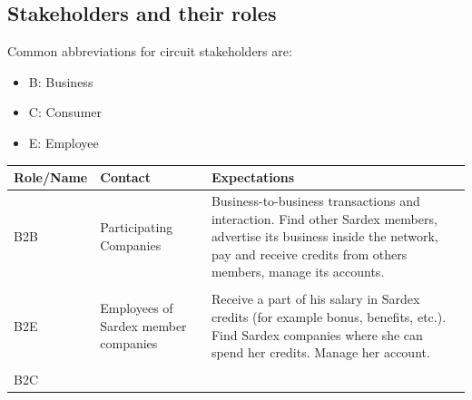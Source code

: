 \subsection{Stakeholders and their roles}\label{_stakeholders}
Common abbreviations for circuit stakeholders are:
\begin{itemize}
	\item B:  Business
	\item C:  Consumer
	\item E:  Employee	
\end{itemize}

{\small
\begin{longtable}[]{@{}lll@{}}
\toprule
\begin{minipage}[b]{0.18\columnwidth}\raggedright\strut
Role/Name\strut
\end{minipage} & \begin{minipage}[b]{0.25\columnwidth}\raggedright\strut
Contact\strut
\end{minipage} & \begin{minipage}[b]{0.45\columnwidth}\raggedright\strut
Expectations\strut
\end{minipage}\tabularnewline
\midrule
\endhead
\begin{minipage}[t]{0.18\columnwidth}B2B \end{minipage} &
\begin{minipage}[t]{0.25\columnwidth}Participating Companies \end{minipage} &
\begin{minipage}[t]{0.45\columnwidth}Business-to-business transactions and interaction. Find other Sardex members, advertise its business inside the network, pay and receive credits from others members, manage its accounts.\end{minipage}
\tabularnewline
\tabularnewline
\begin{minipage}[t]{0.18\columnwidth}B2E \end{minipage} &
\begin{minipage}[t]{0.25\columnwidth}Employees of Sardex member companies\end{minipage} &
\begin{minipage}[t]{0.45\columnwidth}Receive a part of his salary in Sardex credits (for example bonus, benefits, etc.). Find Sardex companies where she can spend her credits. Manage her account.\end{minipage}
\tabularnewline
\tabularnewline
\begin{minipage}[t]{0.18\columnwidth}B2C \end{minipage} &

\end{longtable}}
